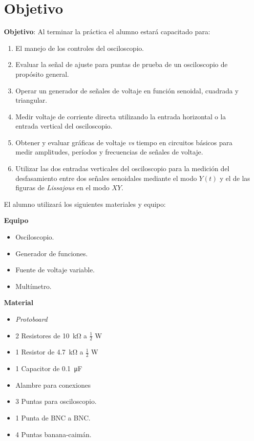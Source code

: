 \documentclass[a4paper,12pt]{article}
\begin{document}
\newpage


\section*{Objetivo}

\textbf{Objetivo}: Al terminar la práctica el alumno estará capacitado para:
\begin{enumerate}
	\item El manejo de los controles del osciloscopio.
   \item Evaluar la señal de ajuste para puntas de prueba de un osciloscopio de propósito general.
   \item Operar un generador de señales de voltaje en función senoidal, cuadrada y triangular.
   \item Medir voltaje de corriente directa utilizando la entrada horizontal o la entrada vertical del osciloscopio.
   \item Obtener y evaluar gráficas de voltaje \emph{vs} tiempo en circuitos básicos para medir amplitudes, períodos y frecuencias de señales de voltaje.
   \item Utilizar las dos entradas verticales del osciloscopio para la medición del desfasamiento entre dos señales senoidales mediante el modo $Y(t)$ y el de las figuras de \emph{Lissajous} en el modo $XY$.
\end{enumerate}

\vspace{0.5cm}

El alumno utilizará los siguientes materiales y equipo:

\begin{multicols}{2}
\textbf{Equipo}\\
\begin{itemize}[nosep]
	\item Osciloscopio.
	\item Generador de funciones.
	\item Fuente de voltaje variable.
	\item Multímetro.
\end{itemize}

\columnbreak

\textbf{Material}\\
\begin{itemize}[nosep]
	\item \textit{Protoboard}
	\item 2 Resistores de \SI{10}{\kohm} a $\frac{1}{2}$ \si{\watt}
	\item 1 Resistor de \SI{4.7}{\kohm} a $\frac{1}{2}$ \si{\watt}
	\item 1 Capacitor de \SI{0.1}{\micro\farad}
	\item Alambre para conexiones
	\item 3 Puntas para osciloscopio.
	\item 1 Punta de BNC a BNC.
	\item 4 Puntas banana-caimán.
	
\end{itemize}

\end{multicols}
\end{document}
